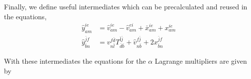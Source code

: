 \documentclass[a4paper,12pt,oneside]{book}
\newcommand{\spa}[1]{{#1}}
\newcommand{\spb}[1]{\bar{#1}}
\begin{document}
Finally, we define useful intermediates which can be precalculated and reused in the equations,
\begin{equation}
\begin{aligned}
\hat y_{\spa{a}\spa{m}}^{\spa{i}\spa{e}} &=\hat v_{\spa{a}\spa{m}}^{\spa{i}\spa{e}} - \hat v_{\spa{a}\spa{m}}^{\spa{e}\spa{i}}
+ \bar x_{\spa{a}\spa{m}}^{\spa{i}\spa{e}}
+ x_{\spa{a}\spa{m}}^{\spa{i}\spa{e}}\\
\hat y_{\spb{b}\spa{n}}^{\spb{j}\spa{f}} &=
v_{\spa{n}\spb{l}}^{\spa{f}\spb{d}} T^{\spb{l}\spb{j}}_{\spb{d}\spb{b}}
+ \hat v_{\spa{n}\spb{b}}^{\spa{f}\spb{j}}
+ 2x_{\spb{b}\spa{n}}^{\spb{j}\spa{f}}
\end{aligned}
\end{equation}


With these intermediates the equations for the $\alpha$ Lagrange multipliers are given by
\end{document}
